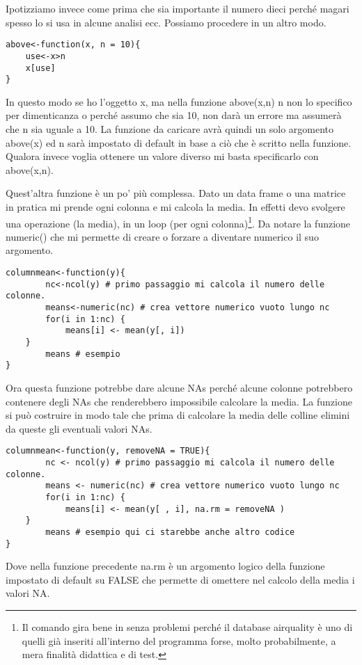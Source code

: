 Ipotizziamo invece come prima che sia importante il numero dieci perché magari
spesso lo si usa in alcune analisi ecc. Possiamo procedere in un altro modo.
\begin{lstlisting}
above<-function(x, n = 10){
	use<-x>n
	x[use]
}
\end{lstlisting}
In questo modo se ho l'oggetto x, ma nella funzione above(x,n) n non lo specifico
per dimenticanza o perché assumo che sia 10, \erre non darà un errore ma assumerà
che n sia uguale a 10. La funzione da caricare avrà quindi un solo argomento above(x)
ed n sarà impostato di default in base a ciò che è scritto nella funzione.
Qualora invece voglia ottenere un valore diverso mi basta specificarlo con above(x,n).


Quest'altra funzione è un po' più complessa. Dato un data frame o una matrice in pratica
mi prende ogni colonna e mi calcola la media. In effetti devo svolgere una operazione 
(la media), in un loop (per ogni colonna)\footnote{Il comando gira bene in \erre senza problemi perché il database airquality è uno di quelli già inseriti all'interno del programma forse, molto probabilmente, a mera finalità didattica e di test.}. Da notare la funzione numeric() che mi permette di creare o forzare a diventare numerico il suo argomento.

\begin{lstlisting}
columnmean<-function(y){
		nc<-ncol(y) # primo passaggio mi calcola il numero delle colonne.
		means<-numeric(nc) # crea vettore numerico vuoto lungo nc
		for(i in 1:nc) {
			means[i] <- mean(y[, i])
	}
		means # esempio
}
\end{lstlisting}

Ora questa funzione potrebbe dare alcune NAs perché alcune colonne potrebbero contenere
degli NAs che renderebbero impossibile calcolare la media.
La funzione si può costruire in modo tale che prima di calcolare la media delle colline
elimini da queste gli eventuali valori NAs.
\begin{lstlisting}
columnmean<-function(y, removeNA = TRUE){
		nc <- ncol(y) # primo passaggio mi calcola il numero delle colonne.
		means <- numeric(nc) # crea vettore numerico vuoto lungo nc
		for(i in 1:nc) {
			means[i] <- mean(y[ , i], na.rm = removeNA )
	}
		means # esempio qui ci starebbe anche altro codice 
}
\end{lstlisting}
Dove nella funzione precedente na.rm è un argomento logico della funzione impostato di
default su FALSE che permette di omettere nel calcolo della media i valori NA.

